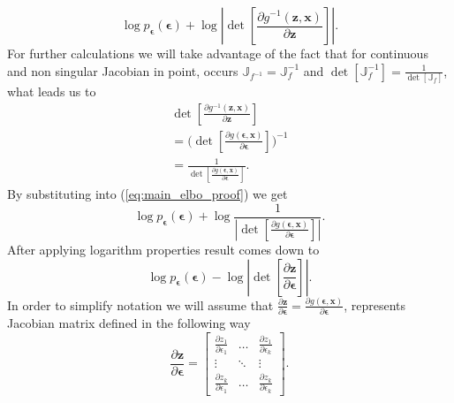 \documentclass[10pt]{article}
\begin{document}
\begin{equation} \label{eq:main_elbo_proof}
    \log p_{\bm{\epsilon}}(\bm{\epsilon}) + 
     \log \left| \det \left[\frac{\partial g^{-1}(\textbf{z}, \textbf{x}) }{\partial \textbf{z}} \right] \right|.
\end{equation}
For further calculations we will take advantage of the fact that for continuous and non singular Jacobian in point,  occurs $\mathbb{J}_{f^{-1}} = \mathbb{J}^{-1}_{f}$ and
$\det[\mathbb{J}^{-1}_{f}] = \frac{1}{ \det[ \mathbb{J}_{f}]}$, what leads us to 
\begin{gather} 
     \det \left[\frac{\partial g^{-1}(\textbf{z}, \textbf{x} ) }{\partial \textbf{z}} \right]  \\
      = \Big( \det\left[\frac{\partial g(\bm{\epsilon}, \textbf{x} ) }{\partial \bm{\epsilon}} \right] \Big)^{-1} \\
      = \frac{1}{\det\left[\frac{\partial g(\bm{\epsilon}, \textbf{x} ) }{\partial \bm{\epsilon}} \right]}   .
\end{gather}
By substituting into (\ref{eq:main_elbo_proof}) we get
\begin{equation}
      \log p_{\bm{\epsilon}}(\bm{\epsilon}) + 
     \log \frac{1}{\left|\det\left[\frac{\partial g(\bm{\epsilon}, \textbf{x} ) }{\partial \bm{\epsilon}} \right] \right|} .
\end{equation}
After applying logarithm properties result comes down to 
\begin{equation} \label{eq:q_z}
      \log p_{\bm{\epsilon}}(\bm{\epsilon}) -
     \log \left|\det\left[\frac{\partial \textbf{z}}{\partial \bm{\epsilon}} \right] \right|.
\end{equation}
In order to simplify notation we will assume that  $\frac{\partial \textbf{z}}{\partial \bm{\epsilon}} =  \frac{\partial g(\bm{\epsilon}, \textbf{x} ) }{\partial \bm{\epsilon}} $, represents Jacobian matrix defined in the following way
\begin{equation}
\frac{\partial \textbf{z}}{\partial \bm{\epsilon}} = 
\begin{bmatrix}
  \frac{\partial z_1}{\partial \epsilon_1} & 
    \dots & 
    \frac{\partial z_1}{\partial \epsilon_k} \\[1ex] %
  \vdots& 
    \ddots & 
      \vdots\\[1ex]
  \frac{\partial z_k}{\partial \epsilon_1} & 
    \dots & 
    \frac{\partial z_k}{\partial  \epsilon_k}
\end{bmatrix}
.
\end{equation}
\end{document}
